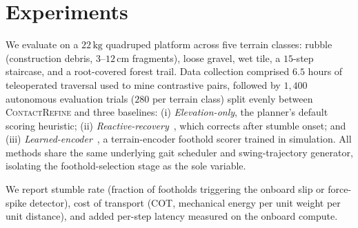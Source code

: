 \section{Experiments}
We evaluate on a $22\,\text{kg}$ quadruped platform across five terrain classes: rubble
(construction debris, $3$--$12\,\text{cm}$ fragments), loose gravel, wet tile, a
$15$-step staircase, and a root-covered forest trail. Data collection comprised $6.5$ hours of
teleoperated traversal used to mine contrastive pairs, followed by $1{,}400$ autonomous
evaluation trials ($280$ per terrain class) split evenly between \textsc{ContactRefine} and
three baselines: (i) \emph{Elevation-only}, the planner's default scoring heuristic; (ii)
\emph{Reactive-recovery}~\cite{oduya2020reactive}, which corrects after stumble onset; and
(iii) \emph{Learned-encoder}~\cite{mbeki2023legged}, a terrain-encoder foothold scorer trained
in simulation. All methods share the same underlying gait scheduler and swing-trajectory
generator, isolating the foothold-selection stage as the sole variable.

We report stumble rate (fraction of footholds triggering the onboard slip or force-spike
detector), cost of transport (COT, mechanical energy per unit weight per unit distance), and
added per-step latency measured on the onboard compute.
